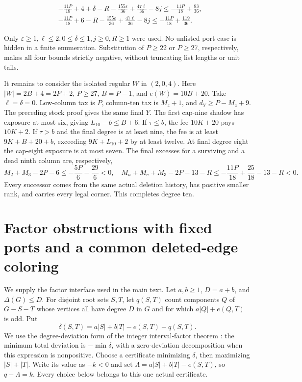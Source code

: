 \documentclass[11pt,a4paper]{article}
\theoremstyle{definition}
\begin{document}
\begin{align*}
 &-\frac{11P}{18}+4+\delta-R-\frac{155\varepsilon}{36}
       +\frac{47\ell}{36}-8j
       \le-\frac{11P}{18}+\frac{83}{36},\\
 &-\frac{11P}{18}+6-R-\frac{155\varepsilon}{36}
       +\frac{47\ell}{36}-8j
       \le-\frac{11P}{18}+\frac{119}{36}.
\end{align*}

Only $\varepsilon\ge1,\ell\le2,0\le\delta\le1,j\ge0,R\ge1$ were used. No unlisted port case is hidden in a finite enumeration. Substitution of $P\ge22$ or $P\ge27$, respectively, makes all four bounds strictly negative, without truncating list lengths or unit tails.

It remains to consider the isolated regular $W$ in $(2,0,4)$. Here $|W|=2B+4=2P+2$, $P\ge27$, $B=P-1$, and $e(W)=10B+20$. Take $\ell=\delta=0$. Low-column tax is $P$, column-ten tax is $M_z+1$, and $d_Y\ge P-M_z+9$. The preceding stock proof gives the same final $Y$. The first cap-nine shadow has exposure at most six, giving $L_{10}-b\le B+6$. If $\tau\le b$, the fee $10K+20$ pays $10K+2$. If $\tau>b$ and the final degree is at least nine, the fee is at least $9K+B+20+b$, exceeding $9K+L_{10}+2$ by at least twelve. At final degree eight the cap-eight exposure is at most seven. The final excesses for a surviving and a dead ninth column are, respectively,
\[
 M_2+M_3-2P-6\le-\frac{5P}{6}-\frac{29}{6}<0,
\quad
 M_u+M_v+M_3-2P-13-R
 \le-\frac{11P}{18}+\frac{25}{18}-13-R<0.
\]
Every successor comes from the same actual deletion history, has positive smaller rank, and carries every legal corner. This completes degree ten.
\section{Factor obstructions with fixed ports and a common deleted-edge coloring}\label{app:factor}
We supply the factor interface used in the main text. Let $a,b\ge1$, $D=a+b$, and $\Delta(G)\le D$. For disjoint root sets $S,T$, let $q(S,T)$ count components $Q$ of $G-S-T$ whose vertices all have degree $D$ in $G$ and for which $a|Q|+e(Q,T)$ is odd. Put
\[
 \delta(S,T)=a|S|+b|T|-e(S,T)-q(S,T).
\]
We use the degree-deviation form of the integer interval-factor theorem \cite{lovasz,luyu}: the minimum total deviation is $-\min\delta$, with a zero-deviation decomposition when this expression is nonpositive. Choose a certificate minimizing $\delta$, then maximizing $|S|+|T|$. Write its value as $-k<0$ and set $\Lambda=a|S|+b|T|-e(S,T)$, so $q-\Lambda=k$. Every choice below belongs to this one actual certificate.
\end{document}
